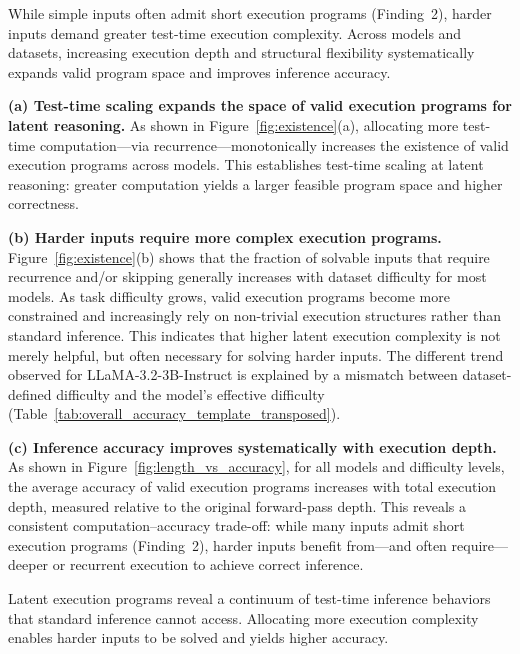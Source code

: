\documentclass{article}
\theoremstyle{plain}
\theoremstyle{definition}
\theoremstyle{remark}
\begin{document}
While simple inputs often admit short execution programs (Finding~2),
harder inputs demand greater test-time execution complexity.
Across models and datasets, increasing execution depth and structural flexibility systematically expands valid program space and improves inference accuracy.

\textbf{(a) Test-time scaling expands the space of valid execution programs for latent reasoning.}
As shown in Figure~\ref{fig:existence}(a),
allocating more test-time computation—via recurrence—monotonically increases the existence of valid execution programs across models.
This establishes test-time scaling at latent reasoning:
greater computation yields a larger feasible program space and higher correctness.


\textbf{(b) Harder inputs require more complex execution programs.}
Figure~\ref{fig:existence}(b) shows that the fraction of solvable inputs
that require recurrence and/or skipping
generally increases with dataset difficulty for most models.
As task difficulty grows,
valid execution programs become more constrained and increasingly rely on
non-trivial execution structures rather than standard inference.
This indicates that higher latent execution complexity is not merely helpful,
but often necessary for solving harder inputs.
The different trend observed for LLaMA-3.2-3B-Instruct
is explained by a mismatch between dataset-defined difficulty
and the model’s effective difficulty
(Table~\ref{tab:overall_accuracy_template_transposed}).

\textbf{(c) Inference accuracy improves systematically with execution depth.}
As shown in Figure~\ref{fig:length_vs_accuracy},
for all models and difficulty levels,
the average accuracy of valid execution programs
increases with total execution depth,
measured relative to the original forward-pass depth.
This reveals a consistent computation--accuracy trade-off:
while many inputs admit short execution programs (Finding~2),
harder inputs benefit from—and often require—
deeper or recurrent execution to achieve correct inference.

Latent execution programs reveal a continuum of test-time inference behaviors
that standard inference cannot access.
Allocating more execution complexity enables harder inputs to be solved
and yields higher accuracy.
\end{document}
